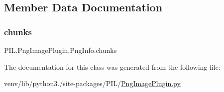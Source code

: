 \subsection{Member Data Documentation}
\mbox{\label{classPIL_1_1PngImagePlugin_1_1PngInfo_a5ec9de6ad200880c6dfadc12333cfb54}} 
\subsubsection{\texorpdfstring{chunks}{chunks}}
{\footnotesize\ttfamily P\+I\+L.\+Png\+Image\+Plugin.\+Png\+Info.\+chunks}



The documentation for this class was generated from the following file\+:\begin{DoxyCompactItemize}
\item 
venv/lib/python3./site-\/packages/\+P\+I\+L/\hyperlink{PngImagePlugin_8py}{Png\+Image\+Plugin.\+py}\end{DoxyCompactItemize}
